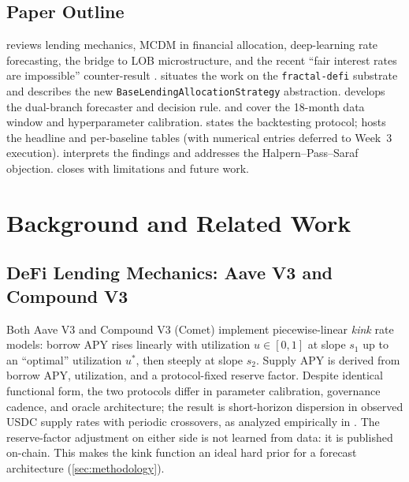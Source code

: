 \documentclass[11pt,a4paper]{article}
\begin{document}
\subsection{Paper Outline}
\label{sec:outline}

 reviews lending mechanics, MCDM in financial
allocation, deep-learning rate forecasting, the bridge to LOB
microstructure, and the recent ``fair interest rates are impossible''
counter-result \cite{halpern2024fairrates}.
 situates the work on the \texttt{fractal-defi}
substrate and describes the new \texttt{BaseLendingAllocationStrategy}
abstraction.  develops the dual-branch forecaster
and decision rule.  and  cover the
18-month data window and hyperparameter calibration.
 states the backtesting protocol;
 hosts the headline and per-baseline tables (with
numerical entries deferred to Week~3 execution).
 interprets the findings and addresses the
Halpern--Pass--Saraf objection.
 closes with limitations and future work.

\section{Background and Related Work}
\label{sec:background}
\label{sec:related}

\subsection{DeFi Lending Mechanics: Aave V3 and Compound V3}
\label{sec:lending-mechanics}

Both Aave V3 and Compound V3 (Comet) implement piecewise-linear
\emph{kink} rate models: borrow APY rises linearly with utilization
$u \in [0,1]$ at slope $s_1$ up to an ``optimal'' utilization $u^*$,
then steeply at slope $s_2$. Supply APY is derived from borrow APY,
utilization, and a protocol-fixed reserve factor. Despite identical
functional form, the two protocols differ in parameter calibration,
governance cadence, and oracle architecture; the result is
short-horizon dispersion in observed USDC supply rates with periodic
crossovers, as analyzed empirically in
\cite{gudgeon2020defi,automatedrisk2025}. The reserve-factor
adjustment on either side is not learned from data: it is published
on-chain. This makes the kink function an ideal hard prior for a
forecast architecture (\cref{sec:methodology}).
\end{document}
